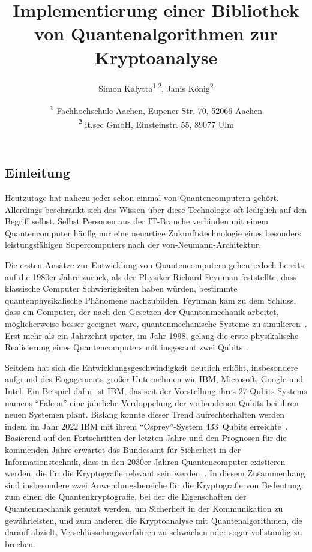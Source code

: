 \documentclass[
  a4paper, %
  10pt, %
  unnumberedsections, %
  twoside, %
]{LTJournalArticle}
\title{Implementierung einer Bibliothek von Quantenalgorithmen zur Kryptoanalyse} %
\author{%
  Simon Kalytta\textsuperscript{1,2}, Janis König\textsuperscript{2}
}
\date{%
  \footnotesize\textsuperscript{\textbf{1}}%
  Fachhochschule Aachen, 
  Eupener Str. 70, 52066 Aachen\\
  \textsuperscript{\textbf{2}}%
  it.sec GmbH,
  Einsteinstr. 55, 89077 Ulm%
}
\begin{document}
\maketitle %


\subsection{Einleitung}

Heutzutage hat nahezu jeder schon einmal von Quantencomputern gehört.
Allerdings beschränkt sich das Wissen über diese Technologie oft lediglich auf den Begriff selbst.
Selbst Personen aus der IT-Branche verbinden mit einem Quantencomputer häufig nur
eine neuartige Zukunftstechnologie eines besonders leistungsfähigen Supercomputers nach der von-Neumann-Architektur.

Die ersten Ansätze zur Entwicklung von Quantencomputern gehen jedoch bereits auf die 1980er Jahre zurück,
als der Physiker Richard Feynman feststellte,
dass klassische Computer Schwierigkeiten haben würden,
bestimmte quantenphysikalische Phänomene nachzubilden.
Feynman kam zu dem Schluss, dass ein Computer,
der nach den Gesetzen der Quantenmechanik arbeitet,
möglicherweise besser geeignet wäre,
quantenmechanische Systeme zu simulieren~\autocite{Feynman:1982}.
Erst mehr als ein Jahrzehnt später, im Jahr 1998,
gelang die erste physikalische Realisierung eines Quantencomputers
mit insgesamt zwei Qubits~\autocite{Chuang:1998ExperimentalIO}.

Seitdem hat sich die Entwicklungsgeschwindigkeit deutlich erhöht,
insbesondere aufgrund des Engagements großer Unternehmen wie IBM, Microsoft, Google und Intel.
Ein Beispiel dafür ist IBM,
das seit der Vorstellung ihres 27-Qubits-Systems namens "`Falcon"'
eine jährliche Verdoppelung der vorhandenen Qubits bei ihren neuen Systemen plant.
Bislang konnte dieser Trend aufrechterhalten werden
indem im Jahr 2022 IBM mit ihrem "`Osprey"'-System 433~Qubits erreichte~\autocite{IBM:2022}.
Basierend auf den Fortschritten der letzten Jahre und
den Prognosen für die kommenden Jahre erwartet
das Bundesamt für Sicherheit in der Informationstechnik,
dass in den 2030er Jahren Quantencomputer existieren werden,
die für die Kryptografie relevant sein werden~\autocite{BSI:2023}.
In diesem Zusammenhang sind insbesondere zwei Anwendungsbereiche für die Kryptografie von Bedeutung:
zum einen die Quantenkryptografie, bei der die Eigenschaften der Quantenmechanik genutzt werden,
um Sicherheit in der Kommunikation zu gewährleisten, und
zum anderen die Kryptoanalyse mit Quantenalgorithmen, die darauf abzielt,
Verschlüsselungsverfahren zu schwächen oder sogar vollständig zu brechen.
\end{document}
